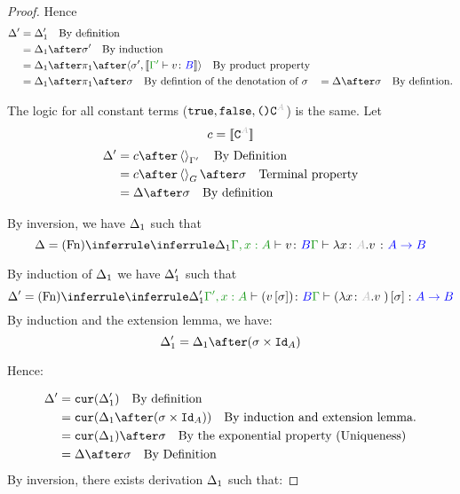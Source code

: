 \documentclass{report}
\begin{document}
\begin{framed}
\begin{proof}
        
        
        Hence
        \begin{align*}
            \D' & = \D_1' \qt{By definition}\\
                & = \D_1\after\si'\qt{By induction}\\
                & = \D_1\after\p\after\pr{\si'}{\deno{\typerelation{\G'}{v}{B}}}\qt{By product property}\\
                & = \D_1\after\p\after\si\qt{By defintion of the denotation of $\si$}
                & = \D\after\si\qt{By defintion.}
        \end{align*}
        
        The logic for all constant terms ($\t,\f,\u\const{A}$) is the same.
        Let
        \begin{equation}
            c = \deno{\const{A}}
        \end{equation}
        \begin{align*}
            \D' & = c\after\term{\G'}\qt{By Definition}\\
                & = c\after\term{G}\after\si\qt{Terminal property}\\
                & = \D\after\si\qt{By definition}
        \end{align*}
        
        By inversion, we have $\Delta_1$ such that
        \begin{equation}
            \D = \ntreeruleI{Fn}{
                \treeruleI{\D_1}{\typerelation{\G, x:A}{v}{B}}
            }{\typerelation{\G}{\lam{x}{A}{v}}{\ab}}
        \end{equation}
        
        By induction of $\Delta_1$ we have $\Delta_1'$ such that
        \begin{equation}
            \D' = \ntreeruleI{Fn}{
                \treeruleI{\D_1'}{\typerelation{\G', x:A}{(v\ssi)}{B}}
            }{\typerelation{\G}{(\lam{x}{A}{v})\ssi}{\ab}}
        \end{equation}
        By induction and the extension lemma, we have:
        \begin{equation}
            \D_1' = \D_1\after(\si\times\Id{A})
        \end{equation}
        
        Hence:
        
        \begin{align*}
            \D' &= \cur{\D_1'}\qt{By definition}\\
                &= \cur{\D_1\after(\si\times\Id{A})}\qt{By induction and extension lemma.}\\
                & = \cur{\D_1}\after\si\qt{By the exponential property (Uniqueness)}\\
                &= \D\after\si\qt{By Definition}\\
        \end{align*}
        By inversion, there exists derivation $\Delta_1$ such that:
        

\end{proof}
\end{framed}
\end{document}
